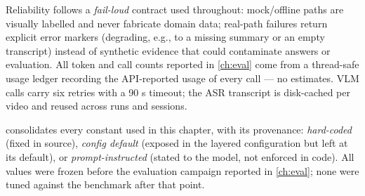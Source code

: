 Reliability follows a \emph{fail-loud} contract used throughout: mock/offline paths are visually
labelled and never fabricate domain data; real-path failures return explicit error markers
(degrading, e.g., to a missing summary or an empty transcript) instead of synthetic evidence that
could contaminate answers or evaluation. All token and call counts reported in \cref{ch:eval} come from a
thread-safe usage ledger recording the API-reported usage of every call --- no estimates. VLM calls
carry six retries with a 90 s timeout; the ASR transcript is disk-cached per video and reused
across runs and sessions.

 consolidates every constant used in this chapter, with its provenance: \emph{hard-coded}
(fixed in source), \emph{config default} (exposed in the layered configuration but left at its
default), or \emph{prompt-instructed} (stated to the model, not enforced in code). All values were
frozen before the evaluation campaign reported in \cref{ch:eval}; none were tuned against the benchmark
after that point.

